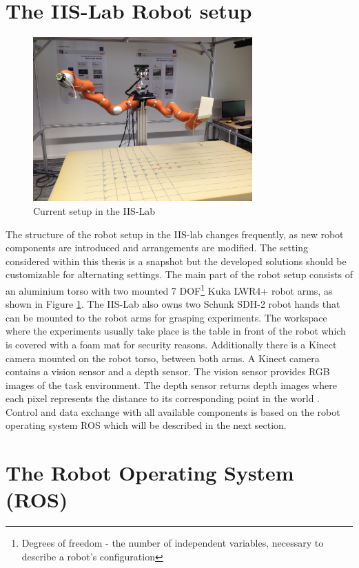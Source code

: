 \section{The IIS-Lab Robot setup}
\begin{figure}[ht]
	\centering
  \includegraphics[width=0.75\textwidth]{images/robot_setup.jpg}
	\caption{Current setup in the IIS-Lab}
	\label{fig:iis_setup}
\end{figure}

The structure of the robot setup in the IIS-lab changes frequently, as new robot components are introduced and arrangements are modified. The setting considered within this thesis is a snapshot but the developed solutions should be customizable for alternating settings. The main part of the robot setup consists of an aluminium torso with two mounted 7 DOF\footnote{Degrees of freedom - the number of independent variables, necessary to describe a robot's configuration} Kuka LWR4+ \citep{kuka2012} robot arms, as shown in Figure \ref{fig:iis_setup}. The IIS-Lab also owns two Schunk SDH-2 \citep{schunk2010} robot hands that can be mounted to the robot arms for grasping experiments. The workspace where the experiments usually take place is the table in front of the robot which is covered with a foam mat for security reasons. Additionally there is a Kinect camera mounted on the robot torso, between both arms. A Kinect camera contains a vision sensor and a depth sensor. The vision sensor provides RGB images of the task environment. The depth sensor returns depth images where each pixel represents the distance to its corresponding point in the world \citep{andersen2012}. Control and data exchange with all available components is based on the robot operating system ROS which will be described in the next section.

\section{The Robot Operating System (ROS)}


